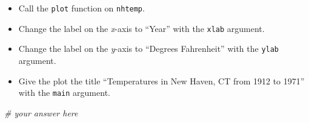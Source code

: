 \documentclass[
]{article}
\newenvironment{Shaded}{\begin{snugshade}}{\end{snugshade}}
\newcommand{\CommentTok}[1]{\textcolor[rgb]{0.56,0.35,0.01}{\textit{#1}}}
\providecommand{\tightlist}{%
  \setlength{\itemsep}{0pt}\setlength{\parskip}{0pt}}
\begin{document}
\begin{itemize}
\tightlist
\item
  Call the \texttt{plot} function on \texttt{nhtemp}.
\item
  Change the label on the \emph{x}-axis to ``Year'' with the
  \texttt{xlab} argument.
\item
  Change the label on the \emph{y}-axis to ``Degrees Fahrenheit'' with
  the \texttt{ylab} argument.
\item
  Give the plot the title ``Temperatures in New Haven, CT from 1912 to
  1971'' with the \texttt{main} argument.
\end{itemize}

\begin{Shaded}
\begin{Highlighting}[]
\CommentTok{\# your answer here}
\end{Highlighting}
\end{Shaded}
\end{document}
